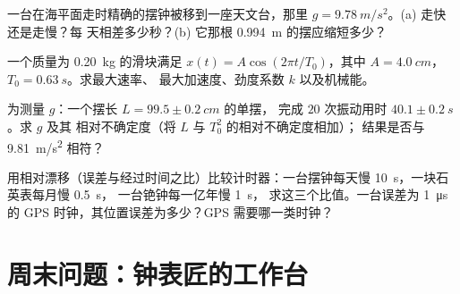 \begin{exercise}[$\star\star\star$]\label{exo:g12:oscillators-and-time:12}
一台在海平面走时精确的摆钟被移到一座天文台，那里
$g = \qty{9.78}{m/s^2}$。(a) 走快还是走慢？每
天相差多少秒？(b) 它那根 \qty{0.994}{m} 的摆应缩短多少？
\end{exercise}

\begin{exercise}[$\star\star\star$]\label{exo:g12:oscillators-and-time:13}
一个质量为 \qty{0.20}{kg} 的滑块满足 $x(t) = A\cos(2\pi t/T_0)$，其中 $A =
\qty{4.0}{cm}$，$T_0 = \qty{0.63}{s}$。求最大速率、
最大加速度、劲度系数 $k$ 以及机械能。
\end{exercise}

\begin{exercise}[$\star\star\star$]\label{exo:g12:oscillators-and-time:14}
为测量 $g$：一个摆长 $L = 99.5 \pm \qty{0.2}{cm}$ 的单摆，
完成 $20$ 次振动用时 $40.1 \pm \qty{0.2}{s}$。求 $g$ 及其
相对不确定度（将 $L$ 与 $T_0^2$ 的相对不确定度相加）；
结果是否与 \qty{9.81}{m/s^2} 相符？
\end{exercise}

\begin{exercise}[$\star\star\star$]\label{exo:g12:oscillators-and-time:15}
用相对漂移（误差与经过时间之比）比较计时器：一台摆钟每天慢
\qty{10}{s}，一块石英表每月慢 \qty{0.5}{s}，
一台铯钟每一亿年慢 \qty{1}{s}，
求这三个比值。一台误差为
\qty{1}{\micro s} 的 GPS 时钟，其位置误差为多少？GPS 需要哪一类时钟？
\end{exercise}

\section{周末问题：钟表匠的工作台}

